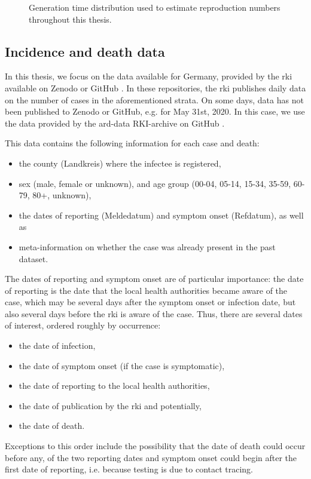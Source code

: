 \begin{figure}
    \resizebox{\textwidth}{!}{%
    }
    \caption{Generation time distribution used to estimate reproduction numbers throughout this thesis.}
    \label{fig:generation_time}
\end{figure}

\subsection{Incidence and death data}
In this thesis, we focus on the data available for Germany, provided by the \acrshort{rki} available on Zenodo \citep{RobertKoch-Institut2024SARSCoV2} or GitHub \citep{RobertKoch-Institut2024SARSCoV2a}. In these repositories, the \acrshort{rki} publishes daily data on the number of cases in the aforementioned strata. On some days, data has not been published to Zenodo or GitHub, e.g. for May 31st, 2020. In this case, we use the data provided by the ard-data RKI-archive on GitHub \citep{MichaelKreil2022RKICoronaDatenArchiv}. 

This data contains the following information for each case and death:
\begin{itemize}
    \item the county (Landkreis) where the infectee is registered,
    \item sex (male, female or unknown), and age group (00-04, 05-14, 15-34, 35-59, 60-79, 80+, unknown),
    \item the dates of reporting (Meldedatum) and symptom onset (Refdatum), as well as
    \item meta-information on whether the case was already present in the past dataset.
\end{itemize}

The dates of reporting and symptom onset are of particular importance: the date of reporting is the date that the local health authorities became aware of the case, which may be several days after the symptom onset or infection date, but also several days before the \acrshort{rki} is aware of the case. Thus, there are several dates of interest, ordered roughly by occurrence: 
\begin{itemize}
    \item the date of infection, 
    \item the date of symptom onset (if the case is symptomatic), 
    \item the date of reporting to the local health authorities,
    \item the date of publication by the \acrshort{rki} and potentially,
    \item the date of death.
\end{itemize}
Exceptions to this order include the possibility that the date of death could occur before any, of the two reporting dates and symptom onset could begin after the first date of reporting, i.e. because testing is due to contact tracing.

